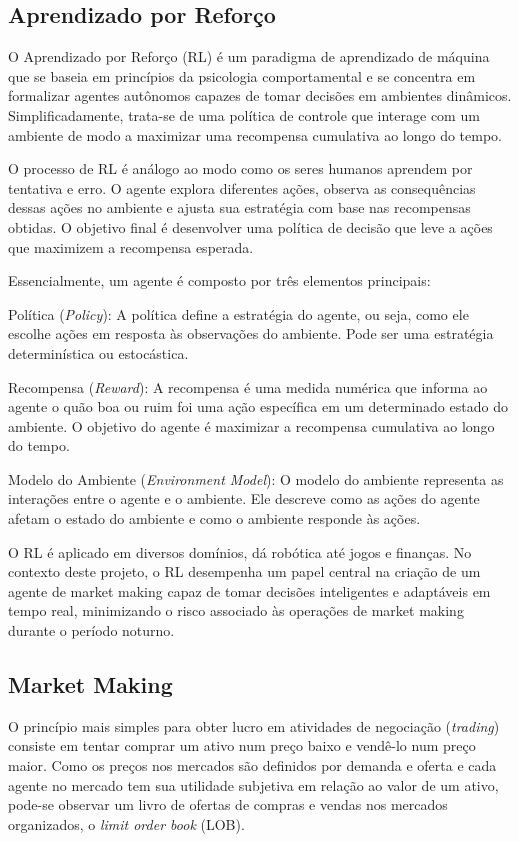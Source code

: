 \subsection{Aprendizado por Reforço}
O Aprendizado por Reforço (RL) é um paradigma de aprendizado de máquina que se baseia em princípios da psicologia comportamental e se concentra em formalizar agentes autônomos capazes de tomar decisões em ambientes dinâmicos. Simplificadamente, trata-se de uma política de controle que interage com um ambiente de modo a maximizar uma recompensa cumulativa ao longo do tempo.

O processo de RL é análogo ao modo como os seres humanos aprendem por tentativa e erro. O agente explora diferentes ações, observa as consequências dessas ações no ambiente e ajusta sua estratégia com base nas recompensas obtidas. O objetivo final é desenvolver uma política de decisão que leve a ações que maximizem a recompensa esperada.

Essencialmente, um agente é composto por três elementos principais:

Política (\textit{Policy}): A política define a estratégia do agente, ou seja, como ele escolhe ações em resposta às observações do ambiente. Pode ser uma estratégia determinística ou estocástica.

Recompensa (\textit{Reward}): A recompensa é uma medida numérica que informa ao agente o quão boa ou ruim foi uma ação específica em um determinado estado do ambiente. O objetivo do agente é maximizar a recompensa cumulativa ao longo do tempo.

Modelo do Ambiente (\textit{Environment Model}): O modelo do ambiente representa as interações entre o agente e o ambiente. Ele descreve como as ações do agente afetam o estado do ambiente e como o ambiente responde às ações.

O RL é aplicado em diversos domínios, dá robótica até jogos e finanças. No contexto deste projeto, o RL desempenha um papel central na criação de um agente de market making capaz de tomar decisões inteligentes e adaptáveis em tempo real, minimizando o risco associado às operações de market making durante o período noturno.

\subsection{Market Making}
O princípio mais simples para obter lucro em atividades de negociação (\textit{trading}) consiste em tentar comprar um ativo num preço baixo e vendê-lo num preço maior.
Como os preços nos mercados são definidos por demanda e oferta e cada agente no mercado tem sua utilidade subjetiva em relação ao valor de um ativo, pode-se observar um livro de ofertas de compras e vendas nos mercados organizados, o \textit{limit order book} (LOB). 

